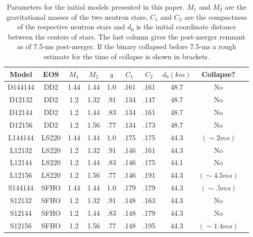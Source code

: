 \begin{table}
\centering
\begin{tabular}{cccccccccl} \toprule
Model & EOS & \(M_{1}\) & \(M_{2}\) & \(q\) & $C_1$ & $C_2$ & $d_0 (km)$  & Collapse?\\ \midrule
D144144 & DD2 & 1.44 & 1.44 & 1.0 & .161 & .161 & 48.7 & No \\
D12132 & DD2 & 1.2 & 1.32 & .91 & .134 & .147 & 48.7 & No\\
D12144 & DD2 & 1.2 & 1.44 & .83 & .134 & .161 & 48.7 & No\\
D12156 & DD2 & 1.2 & 1.56 & .77 & .134 & .173 & 48.7 & No\\
 \midrule
L144144 & LS220 & 1.44 & 1.44 & 1.0 &.175  &.175 & 44.3 & $(\sim 2 ms)$\\
L12132 & LS220 & 1.2 & 1.32 & .91 & .146 & .161  & 44.3 & No \\
L12144 & LS220 & 1.2 & 1.44 & .83 & .146  &.175  & 44.1 & No\\
L12156 & LS220 & 1.2 & 1.56 & .77 & .146  & .191 & 44.3 & $(\sim 4.5 ms)$\\
 \midrule
S144144 & SFHO & 1.44 & 1.44 & 1.0 &.179  & .179 & 44.3 & $(\sim .5 ms)$\\
S12132 & SFHO & 1.2 & 1.32 & .91 & .148  & .163  & 44.3 & No\\
S12144 & SFHO & 1.2 & 1.44 & .83 & .148  & .179 & 44.3 & No\\
S12156 & SFHO & 1.2 & 1.56 & .77 & .148  & .195 & 44.3 & $(\sim 1.4 ms)$\\
 \bottomrule
\end{tabular}
\caption{Parameters for the initial models presented in this paper. $M_1$ and $M_2$ are the gravitational masses of the two neutron stars, $C_1$ and $C_2$ are the compactness of the respective neutron stars and $d_0$ is the initial coordinate distance between the centers of stars. The last column gives the post-merger remnant as of 7.5-ms post-merger. If the binary collapsed before 7.5-ms a rough estimate for the time of collapse is shown in brackets.}
\label{tab:initial_models}
\end{table}


